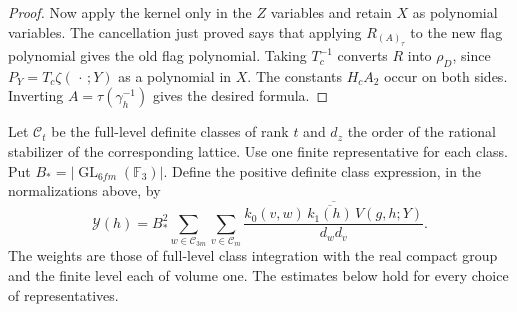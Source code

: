 \documentclass[a4paper,11pt]{article}
\theoremstyle{definition}
\theoremstyle{remark}
\numberwithin{equation}{section}
\begin{document}
\begin{proof}
Now apply the kernel only in the \(Z\) variables and retain
\(X\) as polynomial variables. The cancellation just proved
says that applying \(R_{(A)_\tau}\) to the new flag polynomial
gives the old flag polynomial. Taking \(T_c^{-1}\) converts
\(R\) into \(\rho_D\), since
\(P_Y=T_c\zeta(\,\cdot\,;Y)\) as a polynomial in \(X\).
The constants \(H_c A_2\) occur on both sides. Inverting
\(A=\tau(\gamma_h^{-1})\) gives the desired formula.
\end{proof}

Let \(\mathcal C_t\) be the full-level definite classes of rank
\(t\) and \(d_z\) the order of the rational stabilizer of
the corresponding lattice. Use one finite representative
for each class. Put \(B_*=|\operatorname{GL}_{6fm}(\mathbb F_3)|\).
Define the positive definite class expression, in the
normalizations above, by
\[
 \mathcal Y(h)=B_*^2\sum_{w\in\mathcal C_{3m}}
             \sum_{v\in\mathcal C_m}
       \frac{\overline{k_0(v,w)\,\overline{k_1(h)}\,V(g,h;Y)}}
            {d_w d_v}.
\]
The weights are those of full-level class integration with the
real compact group and the finite level each of volume one.
The estimates below hold for every choice of representatives.
\end{document}
